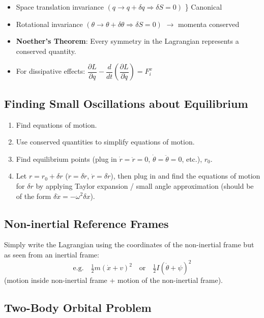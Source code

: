 \begin{itemize}
    \item Space translation invariance $(q \to q + \delta q \Rightarrow \delta S = 0)$ \} Canonical
    \item Rotational invariance $(\theta \to \theta + \delta\theta \Rightarrow \delta S = 0)$ $\to$ momenta conserved
    \item \textbf{Noether's Theorem}: Every symmetry in the Lagrangian represents a conserved quantity.
    \item For dissipative effects: $\dfrac{\partial L}{\partial q} - \dfrac{d}{dt}\!\left(\dfrac{\partial L}{\partial \dot q}\right) = F_i^x$
\end{itemize}

\subsection{Finding Small Oscillations about Equilibrium}

\begin{enumerate}
    \item Find equations of motion.
    \item Use conserved quantities to simplify equations of motion.
    \item Find equilibrium points (plug in $\dot r = \ddot r = 0$, $\dot\theta = \ddot\theta = 0$, etc.), $r_0$.
    \item Let $r = r_0 + \delta r$ ($\ddot r = \delta\ddot r$, $\dot r = \delta\dot r$), then plug in and find the equations of motion for $\delta r$ by applying Taylor expansion / small angle approximation (should be of the form $\delta\ddot x = -\omega^2\delta x$).
\end{enumerate}

\subsection{Non-inertial Reference Frames}

Simply write the Lagrangian using the coordinates of the non-inertial frame but as seen from an inertial frame:
\[
    \text{e.g.}\quad \tfrac{1}{2}m(\dot x + v)^2 \quad\text{or}\quad \tfrac{1}{2}I(\dot\theta + \psi)^2
\]
(motion inside non-inertial frame + motion of the non-inertial frame).

\subsection{Two-Body Orbital Problem}

